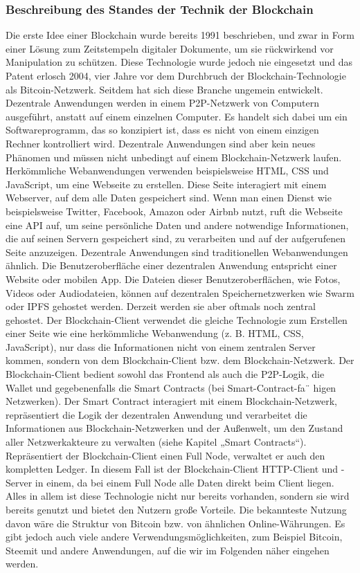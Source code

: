 \subsubsection{Beschreibung des Standes der Technik der Blockchain}
Die erste Idee einer Blockchain wurde bereits 1991 beschrieben, und zwar in Form einer Lösung zum Zeitstempeln digitaler Dokumente, um sie rückwirkend vor Manipulation zu schützen. Diese Technologie wurde jedoch nie eingesetzt und das Patent erlosch 2004, vier Jahre vor dem Durchbruch der Blockchain-Technologie als Bitcoin-Netzwerk. Seitdem hat sich diese Branche ungemein entwickelt.
Dezentrale Anwendungen werden in einem P2P-Netzwerk von Computern ausgeführt, anstatt auf einem einzelnen Computer. Es handelt sich dabei um ein Softwareprogramm, das so konzipiert ist, dass es nicht von einem einzigen Rechner kontrolliert wird. Dezentrale Anwendungen sind aber kein neues Phänomen und müssen nicht unbedingt auf einem  Blockchain-Netzwerk  laufen.  Herkömmliche  Webanwendungen  verwenden  beispielsweise HTML, CSS und JavaScript, um eine Webseite zu erstellen. Diese Seite interagiert mit einem Webserver, auf dem alle Daten gespeichert sind. Wenn man einen Dienst wie beispielsweise Twitter, Facebook, Amazon oder Airbnb nutzt, ruft die Webseite eine API auf, um seine persönliche Daten und andere notwendige Informationen, die auf seinen Servern gespeichert sind, zu verarbeiten und auf der aufgerufenen Seite anzuzeigen. Dezentrale Anwendungen sind traditionellen Webanwendungen ähnlich. Die Benutzeroberfläche einer dezentralen Anwendung entspricht einer Website oder mobilen App. Die Dateien dieser Benutzeroberflächen, wie Fotos, Videos oder Audiodateien, können auf dezentralen Speichernetzwerken wie Swarm oder IPFS gehostet werden. Derzeit werden sie aber oftmals noch zentral gehostet. Der Blockchain-Client verwendet die gleiche Technologie zum Erstellen einer Seite wie eine herkömmliche Webanwendung (z. B. HTML, CSS, JavaScript), nur dass die Informationen nicht von einem zentralen Server kommen, sondern von dem Blockchain-Client bzw. dem Blockchain-Netzwerk. Der Blockchain-Client bedient sowohl das Frontend als auch die P2P-Logik, die Walletund gegebenenfalls die Smart Contracts (bei Smart-Contract-fa¨ higen Netzwerken). Der Smart Contract interagiert mit einem Blockchain-Netzwerk, repräsentiert die Logik der dezentralen Anwendung und verarbeitet die Informationen aus Blockchain-Netzwerken und der Außenwelt, um den Zustand aller Netzwerkakteure zu verwalten (siehe Kapitel
„Smart Contracts“). Repräsentiert der Blockchain-Client einen Full Node, verwaltet er auch den kompletten Ledger. In diesem Fall ist der Blockchain-Client HTTP-Client und -Server in einem, da bei einem Full Node alle Daten direkt beim Client liegen. Alles in allem ist diese Technologie nicht nur bereits vorhanden, sondern sie wird bereits genutzt und bietet den Nutzern große Vorteile. Die bekannteste Nutzung davon wäre die Struktur von Bitcoin bzw. von ähnlichen Online-Währungen.
Es gibt jedoch auch viele andere Verwendungsmöglichkeiten, zum Beispiel Bitcoin, Steemit und andere Anwendungen, auf die wir im Folgenden näher eingehen werden.

